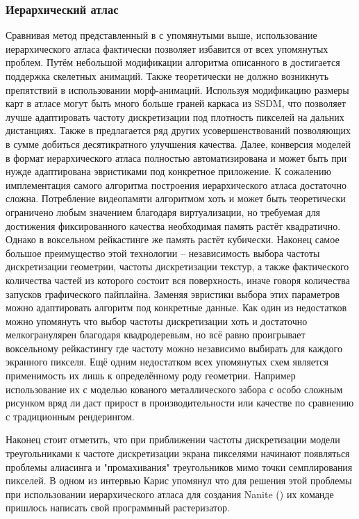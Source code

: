 \subsubsection{Иерархический атлас}
Сравнивая метод представленный в \cite{niski2007multi} с упомянутыми выше, использование иерархического атласа фактически позволяет избавится от всех упомянутых проблем. Путём небольшой модификации алгоритма описанного в \cite{feng2010feature} достигается поддержка скелетных анимаций. Также теоретически не должно возникнуть препятствий в использовании морф-анимаций. Используя модификацию \cite{feng2010feature} размеры карт в атласе могут быть много больше граней каркаса из SSDM, что позволяет лучше адаптировать частоту дискретизации под плотность пикселей на дальних дистанциях. Также в \cite{feng2010feature} предлагается ряд других усовершенствований позволяющих в сумме добиться десятикратного улучшения качества. Далее, конверсия моделей в формат иерархического атласа полностью автоматизирована и может быть при нужде адаптирована эвристиками под конкретное приложение. К сожалению имплементация самого алгоритма построения иерархического атласа достаточно сложна. Потребление видеопамяти алгоритмом хоть и может быть теоретически ограничено любым значением благодаря виртуализации, но требуемая для достижения фиксированного качества необходимая память растёт квадратично. Однако в воксельном рейкастинге же память растёт кубически. Наконец самое большое преимущество этой технологии -- независимость выбора частоты дискретизации геометрии, частоты дискретизации текстур, а также фактического количества частей из которого состоит вся поверхность, иначе говоря количества запусков графического пайплайна. Заменяя эвристики выбора этих параметров можно адаптировать алгоритм под конкретные данные. Как один из недостатков можно упомянуть что выбор частоты дискретизации хоть и достаточно мелкогранулярен благодаря квадродеревьям, но всё равно проигрывает воксельному рейкастингу где частоту можно независимо выбирать для каждого экранного пикселя. Ещё одним недостатком всех упомянутых схем является применимость их лишь к определённому роду геометрии. Например использование их с моделью кованого металлического забора с особо сложным рисунком вряд ли даст прирост в производительности или качестве по сравнению с традиционным рендерингом.

Наконец стоит отметить, что при приближении частоты дискретизации модели треугольниками к частоте дискретизации экрана пикселями начинают появляться проблемы алиасинга и "промахивания" треугольников мимо точки семплирования пикселей. В одном из интервью Карис упомянул что для решения этой проблемы при использовании иерархического атласа для создания Nanite (\cite{nanite}) их команде пришлось написать свой программный растеризатор.

